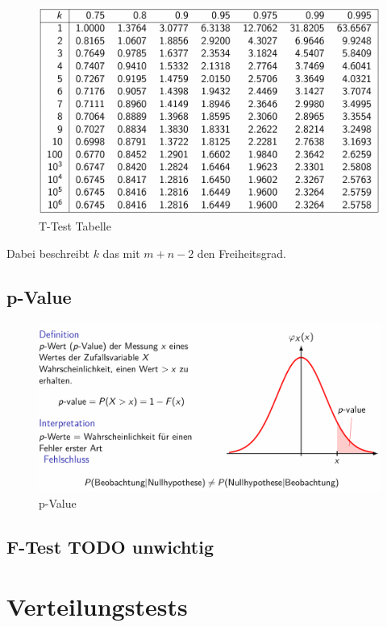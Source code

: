 \documentclass[../Main.tex]{subfiles}
\begin{document}
\begin{figure}[H]
    \centering
    \includegraphics[width=1\linewidth]{Images/t-test-tabelle.png}
    \caption{T-Test Tabelle}
\end{figure}
Dabei beschreibt \(k\) das mit \(m+n-2\) den Freiheitsgrad.

\subsection{p-Value}

\begin{figure}[H]
    \centering
    \includegraphics[width=1\linewidth]{Images/p-value.png}
    \caption{p-Value}
\end{figure}

\subsection{F-Test TODO unwichtig}

\section{Verteilungstests}
\end{document}
